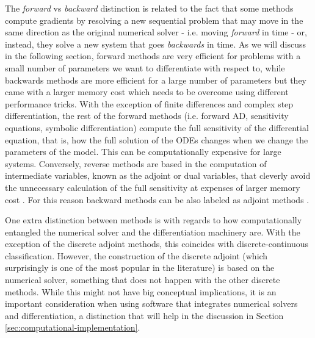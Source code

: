 The \textit{forward} vs \textit{backward} distinction is related to the fact that some methods compute gradients by resolving a new sequential problem that may move in the same direction as the original numerical solver - i.e. moving \textit{forward} in time - or, instead, they solve a new system that goes \textit{backwards} in time. 
As we will discuss in the following section, forward methods are very efficient for problems with a small number of parameters we want to differentiate with respect to, while backwards methods are more efficient for a large number of parameters 
but they came with a larger memory cost which needs to be overcome using different performance tricks. 
With the exception of finite differences and complex step differentiation, the rest of the forward methods (i.e. forward AD, sensitivity equations, symbolic differentiation) compute the full sensitivity of the differential equation, that is, how the full solution of the ODEs changes when we change the parameters of the model. 
This can be computationally expensive for large systems. 
Conversely, reverse methods are based in the computation of intermediate variables, known as the adjoint or dual variables, that cleverly avoid the unnecessary calculation of the full sensitivity at expenses of larger memory cost \cite{Givoli_2021}. 
For this reason backward methods can be also labeled as adjoint methods \cite{ma2021comparison}. 

One extra distinction between methods is with regards to how computationally entangled the numerical solver and the differentiation machinery are. 
With the exception of the discrete adjoint methods, this coincides with discrete-continuous classification. 
However, the construction of the discrete adjoint (which surprisingly is one of the most popular in the literature) is based on the numerical solver, something that does not happen with the other discrete methods. 
While this might not have big conceptual implications, it is an important consideration when using software that integrates numerical solvers and differentiation, a distinction that will help in the discussion in Section \ref{sec:computational-implementation}.

